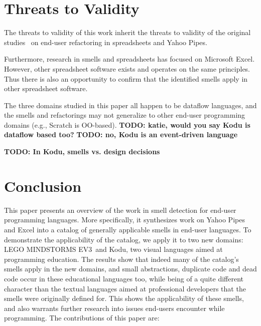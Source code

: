 \documentclass{sig-alternate}
\newcommand{\todo}[1]{\textbf{TODO: #1}}
\newcommand{\ms}{LEGO MINDSTORMS EV3}
\begin{document}
%
%
%



\section{Threats to Validity}
\label{sec:threats}
The threats to validity of this work inherit the threats to validity of the original studies~\cite{Stolee2015, Stolee2011, StoleeTSE2013, Hermans2011, Hermans2012intra, Hermans2012inter, hermans2014bumblebee, badame2012refactoring} on end-user refactoring in spreadsheets and Yahoo Pipes.

Furthermore, research in smells and spreadsheets has focused on Microsoft Excel. However, other spreadsheet software exists and operates on the same principles. Thus there is also an opportunity to confirm that the identified smells apply in other spreadsheet software.


The three domains studied in this paper all happen to be dataflow languages, and the smells and refactorings may not generalize to other end-user programming domains (e.g., Scratch is OO-based). \todo{katie, would you say Kodu is dataflow based too?} \todo{no, Kodu is an event-driven language}


\todo{In Kodu, smells vs. design decisions}

\section{Conclusion}
\label{sec:conclusions}
This paper presents an overview of the work in smell detection for end-user programming languages. More specifically, it synthesizes work on Yahoo Pipes and Excel into a catalog of generally applicable smells in end-user languages. To demonstrate the applicability of the catalog, we apply it to two new domains: \ms~and Kodu, two visual languages aimed at programming education. The results show that indeed many of the catalog's smells apply in the new domains, and small abstractions, duplicate code and dead code occur in these educational languages too, while being of a quite different character than the textual languages aimed at professional developers that the smells were originally defined for. This shows the applicability of these smells, and also warrants further research into issues end-users encounter while programming. The contributions of this paper are:
\end{document}
